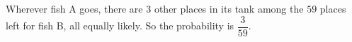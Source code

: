 Wherever fish A goes, there are $3$ other places in its tank among the $59$ places left for fish B, all equally likely. So the probability is $\boxed{\dfrac{3}{59}}$.
